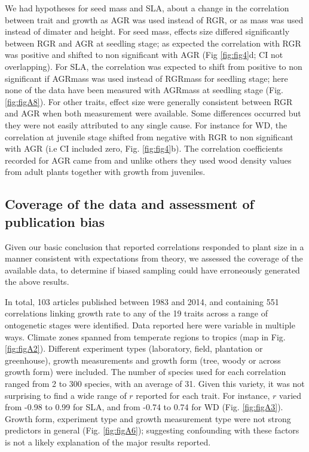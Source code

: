 \documentclass[a4paper,11pt]{article}
\begin{document}
We had hypotheses for seed mass and SLA, about a change in the correlation between trait and growth as AGR was used instead of RGR, or as mass was used instead of dimater and height. For seed mass, effects size differed significantly between RGR and AGR at seedling stage; as expected the correlation with RGR was positive and shifted to non significant with AGR (Fig \ref{fig:fig4}d; CI not overlapping). For SLA, the correlation was expected to shift from positive to non significant if AGRmass was used instead of RGRmass for seedling stage; here none of the data have been measured with AGRmass at seedling stage (Fig. \ref{fig:figA8}). 
For other traits, effect size were generally consistent between RGR and AGR when both measurement were available. Some differences occurred but they were not easily attributed to any single cause. For instance for WD, the correlation at juvenile stage shifted from negative with RGR to non significant with AGR (i.e CI included zero, Fig. \ref{fig:fig4}b). The correlation coefficients recorded for AGR came from \citet{Augspurger:1984ct} and unlike others they used wood density values from adult plants together with growth from juveniles.

\subsection*{Coverage of the data and assessment of publication bias}

Given our basic conclusion that reported correlations responded to plant size in a manner consistent with expectations from theory, we assessed the coverage of the available data, to determine if biased sampling could have erroneously generated the above results.

In total, 103 articles published between 1983 and 2014, and containing 551 correlations linking growth rate to any of the 19 traits across a range of ontogenetic stages were identified. Data reported here were variable in multiple ways. Climate zones spanned from temperate regions to tropics (map in Fig. \ref{fig:figA2}). Different experiment types (laboratory, field, plantation or greenhouse), growth measurements and growth form (tree, woody or across growth form) were included. The number of species used for each correlation ranged from 2 to 300 species, with an average of 31. Given this variety, it was not surprising to find a wide range of $r$ reported for each trait. For instance, $r$ varied from -0.98 to 0.99 for SLA, and from -0.74 to 0.74 for WD (Fig. \ref{fig:figA3}). Growth form, experiment type and growth measurement type were not strong predictors in general (Fig. \ref{fig:figA6}); suggesting confounding with these factors is not a likely explanation of the major results reported.
\end{document}
